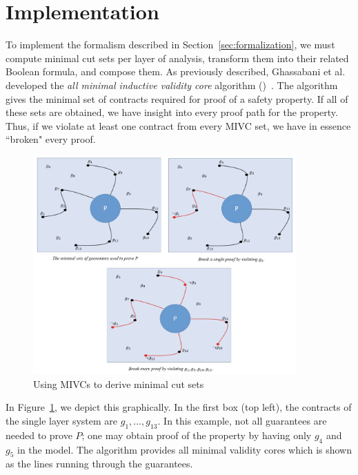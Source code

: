 \section{Implementation}
\label{sec:prelim}

%
To implement the formalism described in Section~\ref{sec:formalization}, we must compute minimal cut sets per layer of analysis, transform them into their related Boolean formula, and compose them. As previously described, Ghassabani et al. developed the \textit{all minimal inductive validity core} algorithm (\aivcalg)~\cite{GhassabaniGW16,Ghassabani2017EfficientGO}. The \aivcalg algorithm gives the minimal set of contracts required for proof of a safety property. If all of these sets are obtained, we have insight into every proof path for the property. Thus, if we violate at least one contract from every MIVC set, we have in essence ``broken" every proof. 
\begin{figure}[h!]
	\begin{center}
		\includegraphics[width=0.9\textwidth]{images/mivcBreaking.png}
	\end{center}
	\caption{Using MIVCs to derive minimal cut sets}
	\label{fig:mivcBreaking}
\end{figure}

In Figure~\ref{fig:mivcBreaking}, we depict this graphically. In the first box (top left), the contracts of the single layer system are $g_1, \dots, g_{13}$. In this example, not all guarantees are needed to prove $P$; one may obtain proof of the property by having only $g_4$ and $g_5$ in the model. The \aivcalg algorithm provides all minimal validity cores which is shown as the lines running through the guarantees. 

